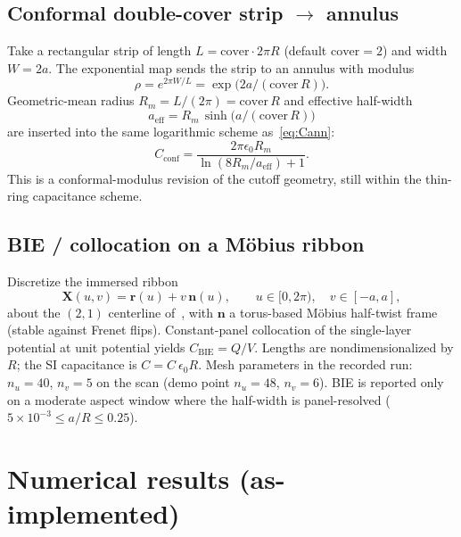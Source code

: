 \documentclass[11pt,a4paper]{article}
\begin{document}
\subsection{Conformal double-cover strip $\to$ annulus}
\label{sec:conformal}

Take a rectangular strip of length $L=\mathrm{cover}\cdot 2\pi R$
(default $\mathrm{cover}=2$) and width $W=2a$.  The exponential map
sends the strip to an annulus with modulus
\begin{equation}
\rho = e^{2\pi W/L} = \exp\!\bigl(2a/(\mathrm{cover}\, R)\bigr).
\end{equation}
Geometric-mean radius $R_m = L/(2\pi)=\mathrm{cover}\, R$ and effective
half-width
\begin{equation}
a_{\mathrm{eff}} = R_m\,\sinh\!\bigl(a/(\mathrm{cover}\, R)\bigr)
\end{equation}
are inserted into the same logarithmic scheme as~\eqref{eq:Cann}:
\begin{equation}
C_{\mathrm{conf}}
=
\frac{2\pi\epsilon_0 R_m}{\ln(8 R_m/a_{\mathrm{eff}})+1}.
\end{equation}
This is a conformal-modulus revision of the cutoff geometry, still
within the thin-ring capacitance scheme.

\subsection{BIE / collocation on a M\"obius ribbon}
\label{sec:bie}

Discretize the immersed ribbon
\begin{equation}
\mathbf{X}(u,v)=\mathbf{r}(u)+v\,\mathbf{n}(u),
\qquad u\in[0,2\pi),\quad v\in[-a,a],
\end{equation}
about the $(2,1)$ centerline of~\cite{mobius2026}, with $\mathbf{n}$ a
torus-based M\"obius half-twist frame (stable against Frenet flips).
Constant-panel collocation of the single-layer potential at unit
potential yields $C_{\mathrm{BIE}}=Q/V$.  Lengths are nondimensionalized
by $R$; the SI capacitance is $C=C_{\hat{}}\,\epsilon_0 R$.
Mesh parameters in the recorded run: $n_u=40$, $n_v=5$ on the scan
(demo point $n_u=48$, $n_v=6$).  BIE is reported only on a moderate
aspect window where the half-width is panel-resolved
($5\times 10^{-3}\le a/R\le 0.25$).

\section{Numerical results (as-implemented)}
\label{sec:results}
\end{document}
